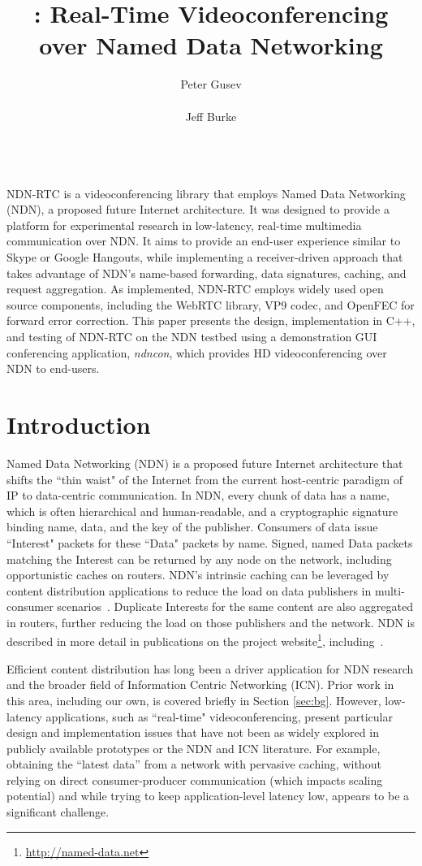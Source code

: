 \documentclass{icn/sig-alternate-2013} %
\title{\ndnrtcName{}: Real-Time Videoconferencing\\ over Named Data Networking}
\author{
\alignauthor Peter Gusev\\
       \affaddr{UCLA REMAP}\\
       \email{peter@remap.ucla.edu}
\alignauthor Jeff Burke\\
       \affaddr{UCLA REMAP}\\
       \email{jburke@remap.ucla.edu}
}
\newcommand{\ndnrtcName}{NDN-RTC} %
\newcommand{\ndnconName}{\emph{ndncon}}
\begin{document}
\maketitle

\abstract
\ndnrtcName{} is a videoconferencing library that employs Named Data Networking (NDN), a proposed future Internet architecture. It was designed to 
provide a platform for experimental research in low-latency, real-time multimedia communication over NDN. It aims to provide an end-user experience similar to Skype or Google Hangouts, while implementing a receiver-driven approach that takes advantage of NDN's name-based forwarding, data signatures, caching, and request aggregation.  As implemented, \ndnrtcName{} employs widely used open source components, including the WebRTC library, VP9 codec, and OpenFEC for forward error correction. This paper presents the design, implementation in C++, and testing of \ndnrtcName{} on the NDN testbed using a demonstration GUI conferencing application, \ndnconName{}, which provides HD videoconferencing over NDN to end-users. 
\section{Introduction}
Named Data Networking (NDN) is a proposed future Internet architecture that shifts the ``thin waist" of the Internet from the current host-centric paradigm of IP to data-centric communication. In NDN, every chunk of data has a name, which is often hierarchical and human-readable, and a cryptographic signature binding name, data, and the key of the publisher.  Consumers of data issue ``Interest" packets for these ``Data" packets by name. Signed, named Data packets matching the Interest can be returned by any node on the network, including opportunistic caches on routers. NDN's intrinsic caching can be leveraged by content distribution applications to reduce the load on data publishers in multi-consumer scenarios~\cite{ndnvideo}. Duplicate Interests for the same content are also aggregated in routers, further reducing the load on those publishers and the network. NDN is described in more detail in publications on the project website\footnote{\url{http://named-data.net}}, including~\cite{ndntechreport, ndntechreport0, ndn-netw}.

Efficient content distribution has long been a driver application for NDN research and the broader field of Information Centric Networking (ICN). Prior work in this area, including our own, is covered briefly in Section \ref{sec:bg}.  However, low-latency applications, such as ``real-time" videoconferencing, present particular design and implementation issues that have not been as widely explored in publicly available prototypes or the NDN and ICN literature. For example, obtaining the ``latest data'' from a network with pervasive caching, without relying on direct consumer-producer communication (which impacts scaling potential) and while trying to keep application-level latency low, appears to be a significant challenge.
\end{document}
